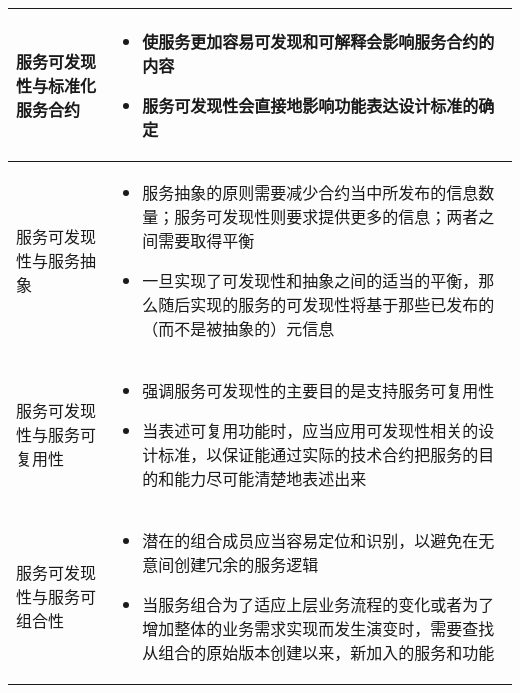 \begin{longtable}{|m{3cm}<{\centering}|m{12cm}|}
    \hline
    服务可发现性与标准化服务合约
    & 
    \vspace{-1.3em}
    \begin{itemize}[leftmargin=1.5em,itemsep=-3pt,topsep=-3pt]
        \item 使服务更加容易可发现和可解释会影响服务合约的内容
        \item 服务可发现性会直接地影响功能表达设计标准的确定 
    \vspace{-1.5em}
    \end{itemize}  
    \\ \hline
    服务可发现性与服务抽象
    & 
    \vspace{-1.3em}
    \begin{itemize}[leftmargin=1.5em,itemsep=-3pt,topsep=-3pt]
        \item 服务抽象的原则需要减少合约当中所发布的信息数量；服务可发现性则要求提供更多的信息；两者之间需要取得平衡
        \item 一旦实现了可发现性和抽象之间的适当的平衡，那么随后实现的服务的可发现性将基于那些已发布的（而不是被抽象的）元信息 
    \vspace{-1.5em}
    \end{itemize}  
    \\ \hline
    服务可发现性与服务可复用性
    & 
    \vspace{-1.3em}
    \begin{itemize}[leftmargin=1.5em,itemsep=-3pt,topsep=-3pt]
        \item 强调服务可发现性的主要目的是支持服务可复用性
        \item 当表述可复用功能时，应当应用可发现性相关的设计标准，以保证能通过实际的技术合约把服务的目的和能力尽可能清楚地表述出来 
    \vspace{-1.5em}
    \end{itemize}  
    \\ \hline
    服务可发现性与服务可组合性
    & 
    \vspace{-1.3em}
    \begin{itemize}[leftmargin=1.5em,itemsep=-3pt,topsep=-3pt]
        \item 潜在的组合成员应当容易定位和识别，以避免在无意间创建冗余的服务逻辑
        \item 当服务组合为了适应上层业务流程的变化或者为了增加整体的业务需求实现而发生演变时，需要查找从组合的原始版本创建以来，新加入的服务和功能 
    \vspace{-1.5em}
    \end{itemize}  
    \\ \hline
\end{longtable}
